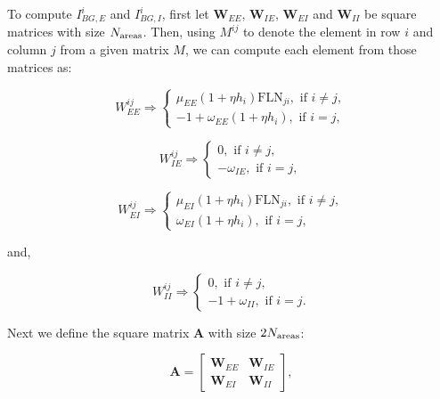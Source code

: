 To compute $I_{BG,E}^{i}$ and $I_{BG,I}^{i}$, first let $\pmb W_{EE}$, $\pmb W_{IE}$, $\pmb W_{EI}$ and $\pmb W_{II}$ be square matrices with size $N_{\rm areas}$. Then, using $M^{ij}$ to denote the element in row $i$ and column $j$ from a given matrix $M$, we can compute each element from those matrices as:

\begin{equation}
W_{EE}^{ij} \Rightarrow
\begin{cases}
\mu_{EE}(1+\eta h_{i})\text{FLN}_{ji}, \text{ if } i \neq j,\\
-1 + \omega_{EE}(1+\eta h_{i}), \text{ if } i = j,
\end{cases}
\label{eq::wee}
\end{equation}

\begin{equation}
W_{IE}^{ij} \Rightarrow
\begin{cases}
0, \text{ if } i \neq j,\\
-\omega_{IE}, \text{ if } i = j,
\end{cases}
\label{eq::wie}
\end{equation}

\begin{equation}
W_{EI}^{ij} \Rightarrow
\begin{cases}
\mu_{EI}(1+\eta h_{i})\text{FLN}_{ji}, \text{ if } i \neq j,\\
\omega_{EI}(1+\eta h_{i}), \text{ if } i = j,
\end{cases}
\label{eq::wei}
\end{equation}

\noindent and,

\begin{equation}
W_{II}^{ij} \Rightarrow
\begin{cases}
0, \text{ if } i \neq j,\\
-1 + \omega_{II}, \text{ if } i = j.
\end{cases}
\label{eq::wii}
\end{equation}

Next we define the square matrix $\pmb A$ with size $2N_{\rm areas}$:


\begin{equation}
    \pmb A = \begin{bmatrix} 
                    \pmb W_{EE} & \pmb W_{IE} \\
                    \pmb W_{EI}& \pmb W_{II}
                 \end{bmatrix} ,
\end{equation}

